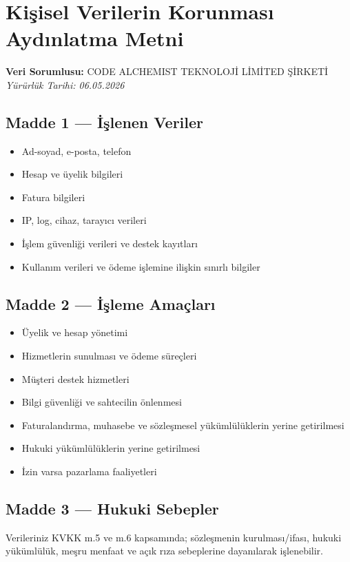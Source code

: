 \documentclass[12pt,a4paper]{article}
\begin{document}
\section{Ki\c{s}isel Verilerin Korunmas{\i} Ayd{\i}nlatma Metni}
\textbf{Veri Sorumlusu:} CODE ALCHEMIST TEKNOLOJ\.{I} L\.{I}M\.{I}TED \c{S}\.{I}RKET\.{I}\\
\textit{Y\"{u}r\"{u}rl\"{u}k Tarihi: 06.05.2026}

\subsection*{Madde 1 --- \.{I}\c{s}lenen Veriler}
\begin{itemize}
  \item Ad-soyad, e-posta, telefon
  \item Hesap ve \"{u}yelik bilgileri
  \item Fatura bilgileri
  \item IP, log, cihaz, taray{\i}c{\i} verileri
  \item \.{I}\c{s}lem g\"{u}venli\u{g}i verileri ve destek kay{\i}tlar{\i}
  \item Kullan{\i}m verileri ve \"{o}deme i\c{s}lemine ili\c{s}kin s{\i}n{\i}rl{\i} bilgiler
\end{itemize}

\subsection*{Madde 2 --- \.{I}\c{s}leme Ama\c{c}lar{\i}}
\begin{itemize}
  \item \"{U}yelik ve hesap y\"{o}netimi
  \item Hizmetlerin sunulmas{\i} ve \"{o}deme s\"{u}re\c{c}leri
  \item M\"{u}\c{s}teri destek hizmetleri
  \item Bilgi g\"{u}venli\u{g}i ve sahtecilin \"{o}nlenmesi
  \item Faturaland{\i}rma, muhasebe ve s\"{o}zle\c{s}mesel y\"{u}k\"{u}ml\"{u}l\"{u}klerin yerine getirilmesi
  \item Hukuki y\"{u}k\"{u}ml\"{u}l\"{u}klerin yerine getirilmesi
  \item \.{I}zin varsa pazarlama faaliyetleri
\end{itemize}

\subsection*{Madde 3 --- Hukuki Sebepler}
Verileriniz KVKK m.5 ve m.6 kapsam{\i}nda; s\"{o}zle\c{s}menin kurulmas{\i}/ifas{\i}, hukuki
y\"{u}k\"{u}ml\"{u}l\"{u}k, me\c{s}ru menfaat ve a\c{c}{\i}k r{\i}za sebeplerine dayan{\i}larak i\c{s}lenebilir.
\end{document}
